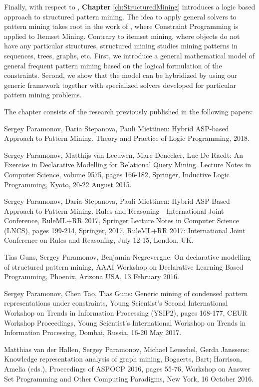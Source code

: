 Finally, with respect to \cfour, \textbf{Chapter} \ref{ch:StructuredMining} introduces a logic
based approach to structured pattern mining. The idea to apply general
solvers to pattern mining takes root in the work of
\textcite{declrativeapproach}, where Constraint Programming is applied to
Itemset Mining. Contrary to itemset mining, where objects do not have
any particular structures, structured mining studies mining patterns
in sequences, trees, graphs, etc. First, we introduce a general
mathematical model of general frequent pattern mining based on the logical formulation of
the constraints. Second, we show that the model can be hybridized by
using our generic framework together with specialized solvers
developed for particular pattern mining problems.

The chapter consists of the research previously published in the following papers:
\begin{addmargin}[2em]{2em}
\pubrev
Sergey Paramonov, Daria Stepanova, Pauli Miettinen: Hybrid ASP-based
    Approach to Pattern Mining. Theory and Practice of Logic
    Programming, 2018.
\pubrevend

Sergey Paramonov, Matthijs van Leeuwen, Marc Denecker, Luc De Raedt:
An Exercise in Declarative Modelling for Relational Query Mining.
Lecture Notes in Computer Science, volume 9575, pages 166-182,
    Springer, Inductive Logic Programming, Kyoto, 20-22 August 2015.

Sergey Paramonov, Daria Stepanova, Pauli Miettinen:
Hybrid ASP-Based Approach to Pattern Mining.  
Rules and Reasoning - International Joint Conference, RuleML+RR 2017,
    Springer Lecture Notes in Computer Science (LNCS), pages 199-214,
    Springer, 2017, RuleML+RR 2017: International Joint Conference on
    Rules and Reasoning, July 12-15, London, UK.

Tias Guns, Sergey Paramonov, Benjamin Negrevergne: On declarative
    modelling of structured pattern mining, AAAI Workshop on
    Declarative Learning Based Programming, Phoenix, Arizona USA, 13
    February 2016.

Sergey Paramonov, Chen Tao, Tias Guns: Generic mining of condensed
    pattern representations under constraints, Young Scientist's
    Second International Workshop on Trends in Information Processing
    (YSIP2), pages 168-177, CEUR Workshop Proceedings, Young
    Scientist's International Workshop on Trends in Information
    Processing, Dombai, Russia, 16-20 May 2017.

Matthias van der Hallen, Sergey Paramonov, Michael Leuschel, Gerda
    Janssens: Knowledge representation analysis of graph mining,
    Bogaerts, Bart; Harrison, Amelia (eds.), Proceedings of ASPOCP
    2016, pages 55-76, Workshop on Answer Set Programming and Other
    Computing Paradigms, New York, 16 October 2016.
\end{addmargin}




